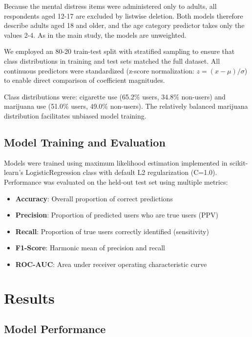 \documentclass[conference]{IEEEtran}
\begin{document}
Because the mental distress items were administered only to adults, all respondents aged 12-17 are excluded by listwise deletion. Both models therefore describe adults aged 18 and older, and the age category predictor takes only the values 2-4. As in the main study, the models are unweighted.

We employed an 80-20 train-test split with stratified sampling to ensure that class distributions in training and test sets matched the full dataset. All continuous predictors were standardized (z-score normalization: $z = (x - \mu)/\sigma$) to enable direct comparison of coefficient magnitudes.

Class distributions were: cigarette use (65.2\% users, 34.8\% non-users) and marijuana use (51.0\% users, 49.0\% non-users). The relatively balanced marijuana distribution facilitates unbiased model training.

\subsection{Model Training and Evaluation}

Models were trained using maximum likelihood estimation implemented in scikit-learn's LogisticRegression class with default L2 regularization (C=1.0). Performance was evaluated on the held-out test set using multiple metrics:

\begin{itemize}
    \item \textbf{Accuracy}: Overall proportion of correct predictions
    \item \textbf{Precision}: Proportion of predicted users who are true users (PPV)
    \item \textbf{Recall}: Proportion of true users correctly identified (sensitivity)
    \item \textbf{F1-Score}: Harmonic mean of precision and recall
    \item \textbf{ROC-AUC}: Area under receiver operating characteristic curve
\end{itemize}

\section{Results}

\subsection{Model Performance}
\end{document}
